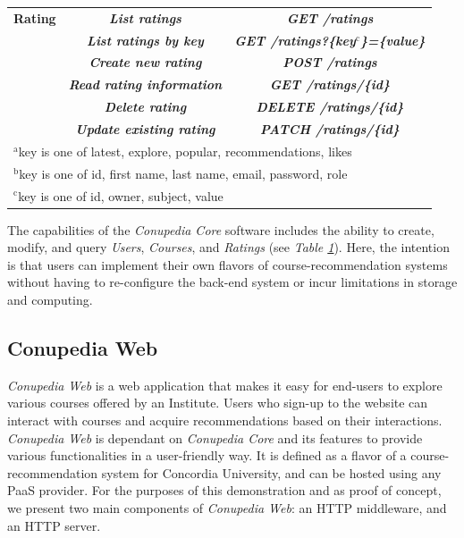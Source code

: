 \documentclass[conference]{IEEEtran}
\begin{document}
\begin{table}[H]
\begin{center}
\begin{tabular}{|c|c|c|}
                        \cline{1-3}
                        \textbf{Rating} & \textbf{\textit{List ratings}}& \textbf{\textit{GET /ratings }}\\
                        \textbf{} & \textbf{\textit{List ratings by key}}& \textbf{\textit{GET /ratings?\{key$^{\mathrm{c}}$\}=\{value\} }}\\
                        \textbf{} & \textbf{\textit{Create new rating}}& \textbf{\textit{POST /ratings }}\\
                        \textbf{} & \textbf{\textit{Read rating information}}& \textbf{\textit{GET /ratings/\{id\} }}\\
                        \textbf{} & \textbf{\textit{Delete rating}}& \textbf{\textit{DELETE /ratings/\{id\} }}\\
                        \textbf{} & \textbf{\textit{Update existing rating}}& \textbf{\textit{PATCH /ratings/\{id\} }}\\
                        
                        \hline
                        
                        \multicolumn{3}{l}{$^{\mathrm{a}}$key is one of latest, explore, popular, recommendations, likes}\\
                        \multicolumn{3}{l}{$^{\mathrm{b}}$key is one of id, first name, last name, email, password, role}\\
                        \multicolumn{3}{l}{$^{\mathrm{c}}$key is one of id, owner, subject, value}
                    \end{tabular}
                \label{tab1}
                \end{center}
            \end{table}
            
            The capabilities of the \textit{Conupedia Core} software includes the ability to create, modify, and query \textit{Users}, \textit{Courses}, and \textit{Ratings} (see \textit{Table \ref{tab1}}). Here, the intention is that users can implement their own flavors of course-recommendation systems without having to re-configure the back-end system or incur limitations in storage and computing.
            
    \subsection{Conupedia Web}
        \textit{Conupedia Web} is a web application that makes it easy for end-users to explore various courses offered by an Institute.
        Users who sign-up to the website can interact with courses and acquire recommendations based on their interactions.
        \textit{Conupedia Web} is dependant on \textit{Conupedia Core} and its features to provide various functionalities in a user-friendly way.
        It is defined as a flavor of a course-recommendation system for Concordia University, and can be hosted using any PaaS provider.
        For the purposes of this demonstration and as proof of concept, we present two main components of \textit{Conupedia Web}: an HTTP middleware, and an HTTP server.\\
        
\end{document}
